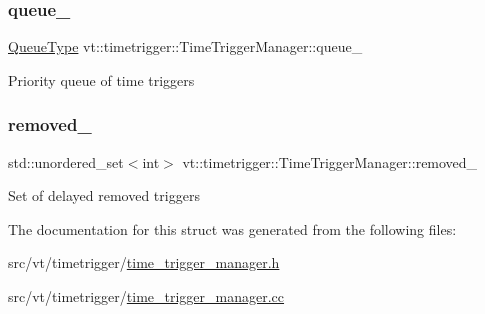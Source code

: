 \subsubsection{\texorpdfstring{queue\+\_\+}{queue\_}}
{\footnotesize\ttfamily \hyperlink{structvt_1_1timetrigger_1_1_time_trigger_manager_ad5dc7eeeb4b0d12a5582544d8f0a08c8}{Queue\+Type} vt\+::timetrigger\+::\+Time\+Trigger\+Manager\+::queue\+\_\+\hspace{0.3cm}{\ttfamily [private]}}

Priority queue of time triggers \mbox{\label{structvt_1_1timetrigger_1_1_time_trigger_manager_aac6dda4fd78e5338f6bec56b75e038cd}} 
\subsubsection{\texorpdfstring{removed\+\_\+}{removed\_}}
{\footnotesize\ttfamily std\+::unordered\+\_\+set$<$int$>$ vt\+::timetrigger\+::\+Time\+Trigger\+Manager\+::removed\+\_\+\hspace{0.3cm}{\ttfamily [private]}}

Set of delayed removed triggers 

The documentation for this struct was generated from the following files\+:\begin{DoxyCompactItemize}
\item 
src/vt/timetrigger/\hyperlink{time__trigger__manager_8h}{time\+\_\+trigger\+\_\+manager.\+h}\item 
src/vt/timetrigger/\hyperlink{time__trigger__manager_8cc}{time\+\_\+trigger\+\_\+manager.\+cc}\end{DoxyCompactItemize}
